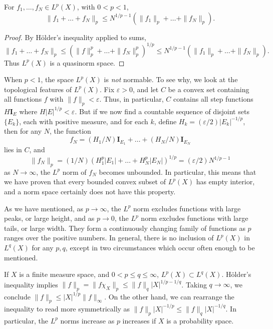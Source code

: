 \begin{theorem}
    For $f_1, \dots, f_N \in L^p(X)$, with $0 < p < 1$,
    \[ \| f_1 + \dots + f_N \|_p \leq N^{1/p - 1} (\| f_1 \|_p + \dots + \| f_N \|_p). \]
\end{theorem}
\begin{proof}
    By H\"{o}lder's inequality applied to sums,
    \[ \| f_1 + \dots + f_N \|_p \leq (\| f \|_p^p + \dots + \| f_N \|_p^p)^{1/p} \leq N^{1/p - 1} (\| f_1 \|_p + \dots + \| f_N \|_p). \]
    Thus $L^p(X)$ is a quasinorm space.
\end{proof}

\begin{remark}
    When $p < 1$, the space $L^p(X)$ is \emph{not} normable. To see why, we look at the topological features of $L^p(X)$. Fix $\varepsilon > 0$, and let $C$ be a convex set containing all functions $f$ with $\| f \|_p < \varepsilon$. Thus, in particular, $C$ contains all step functions $H \mathbf{I}_E$ where $H |E|^{1/p} < \varepsilon$. But if we now find a countable sequence of disjoint sets $\{ E_k \}$, each with positive measure, and for each $k$, define $H_k = (\varepsilon/2) |E_k|^{-1/p}$, then for any $N$, the function
    \[ f_N = (H_1/N) \mathbf{I}_{E_1} + \dots + (H_N/N) \mathbf{I}_{E_N} \]
    lies in $C$, and
    \[ \| f_N \|_p = (1/N) (H_1^p |E_1| + \dots + H_N^p |E_N|)^{1/p} = (\varepsilon/2) N^{1/p - 1} \]
    as $N \to \infty$, the $L^p$ norm of $f_N$ becomes unbounded. In particular, this means that we have proven that every bounded convex subset of $L^p(X)$ has empty interior, and a norm space certainly does not have this property.
\end{remark}

As we have mentioned, as $p \to \infty$, the $L^p$ norm excludes functions with large peaks, or large height, and as $p \to 0$, the $L^p$ norm excludes functions with large tails, or large width. They form a continuously changing family of functions as $p$ ranges over the positive numbers. In general, there is no inclusion of $L^p(X)$ in $L^q(X)$ for any $p,q$, except in two circumstances which occur often enough to be mentioned.

\begin{example}
  If $X$ is a finite measure space, and $0 < p \leq q \leq \infty$, $L^p(X) \subset L^q(X)$. H\"{o}lder's inequality implies $\| f \|_p = \| f \chi_X \|_p \leq \| f \|_q |X|^{1/p-1/q}$. Taking $q \to \infty$, we conclude $\| f \|_p \leq | X |^{1/p} \| f \|_\infty$. On the other hand, we can rearrange the inequality to read more symmetrically as $\| f \|_p |X|^{-1/p} \leq \| f \|_q |X|^{-1/q}$. In particular, the $L^p$ norms increase as $p$ increases if $X$ is a probability space.
\end{example}

